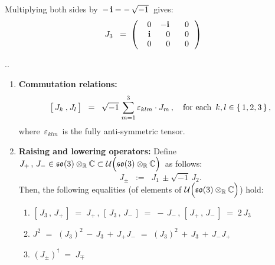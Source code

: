 Multiplying both sides by \,$-\,\textnormal{\bf i} = -\,\sqrt{-1}$\, gives:
\begin{equation*}
J_{3}
\;\; = \;
	\left(\!
		\begin{array}{ccc}
			{\color{white}-}0 & {\color{black}-}\i & {\color{white}-}0 \\
			{\color{white}-}\i & {\color{white}-}0 & {\color{white}-}0 \\
			{\color{white}-}0 & {\color{white}-}0 & {\color{white}-}0 \\
			\end{array}
		\,\right)
\end{equation*}



\begin{proposition}
{\color{white}.}\vskip -0.5cm{\color{white}.}
\begin{enumerate}
\item
	\textbf{Commutation relations:}\;\;
	\begin{equation*}
	\left[\,J_{k}\,\overset{{\color{white}1}}{,}\,J_{l}\,\right]
	\;\; = \;\;
		\sqrt{-1}\;\overset{3}{\underset{m=1}{\sum}}\,\varepsilon_{klm}\cdot J_{m}\,,
	\quad
	\textnormal{for each \,$k, l \in \{\,1,2,3\,\}$}\,,
	\end{equation*}
	where \,$\varepsilon_{klm}$\, is the fully anti-symmetric tensor.
\item
	\textbf{Raising and lowering operators:}\;\;
	Define \,$J_{+}\,,\, J_{-} \in \mathfrak{so}(3) \otimes_{\Re} \C \subset \mathcal{U}\!\left(\mathfrak{so}(3) \overset{{\color{white}.}}{\otimes_{\Re}} \C\right)$\, as follows:
	\begin{equation*}
	J_{\pm} \;\; := \;\; J_{1} \, \pm \sqrt{-1}\,J_{2}.
	\end{equation*}
	Then, the following equalities (of elements of $\mathcal{U}\!\left(\mathfrak{so}(3) \overset{{\color{white}.}}{\otimes_{\Re}} \C\right)$) hold:
	\begin{enumerate}
	\item
		$\left[\,J_{3}\,,\,J_{+}\,\right] \;=\; J_{+}$\,,
		\quad
		$\left[\,J_{3}\,,\,J_{-}\,\right] \;=\; -\,J_{-}$\,,
		\quad
		$\left[\,J_{+}\,,\,J_{-}\,\right] \;=\; 2\,J_{3}$
	\item
		$J^{2}$
		\; $=$ \; $(J_{3})^{2} \,-\, J_{3} \,+\, J_{+}J_{-}$
		\; $=$ \; $(J_{3})^{2} \,+\, J_{3} \,+\, J_{-}J_{+}$
	\item
		$(J_{\pm})^{\dagger} \; = \; J_{\mp}$

\end{enumerate}
\end{enumerate}
\end{proposition}
